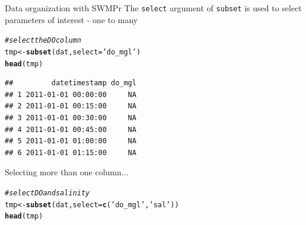 \documentclass[xcolor=dvipsnames,serif]{beamer}\usepackage[]{graphicx}\usepackage[]{color}
\makeatletter
\newcommand{\hlstr}[1]{\textcolor[rgb]{0.192,0.494,0.8}{#1}}%
\newcommand{\hlcom}[1]{\textcolor[rgb]{0.678,0.584,0.686}{\textit{#1}}}%
\newcommand{\hlstd}[1]{\textcolor[rgb]{0.345,0.345,0.345}{#1}}%
\newcommand{\hlkwb}[1]{\textcolor[rgb]{0.69,0.353,0.396}{#1}}%
\newcommand{\hlkwc}[1]{\textcolor[rgb]{0.333,0.667,0.333}{#1}}%
\newcommand{\hlkwd}[1]{\textcolor[rgb]{0.737,0.353,0.396}{\textbf{#1}}}%
\newenvironment{kframe}{%
 \def\at@end@of@kframe{}%
 \ifinner\ifhmode%
  \def\at@end@of@kframe{\end{minipage}}%
  \begin{minipage}{\columnwidth}%
 \fi\fi%
 \def\FrameCommand##1{\hskip\@totalleftmargin \hskip-\fboxsep
 \colorbox{shadecolor}{##1}\hskip-\fboxsep
     \hskip-\linewidth \hskip-\@totalleftmargin \hskip\columnwidth}%
 \MakeFramed {\advance\hsize-\width
   \@totalleftmargin\z@ \linewidth\hsize
   \@setminipage}}%
 {\par\unskip\endMakeFramed%
 \at@end@of@kframe}
\newenvironment{knitrout}{}{} %
\makeatother
\begin{document}
\begin{frame}[fragile]{Data organization with SWMPr}
\onslide<+->
The \texttt{select} argument of \texttt{subset} is used to select parameters of interest - one to many
\begin{knitrout}\scriptsize
{}\color{fgcolor}\begin{kframe}
\begin{alltt}
\hlcom{# select the DO column}
\hlstd{tmp} \hlkwb{<-} \hlkwd{subset}\hlstd{(dat,} \hlkwc{select} \hlstd{=} \hlstr{'do_mgl'}\hlstd{)}
\hlkwd{head}\hlstd{(tmp)}
\end{alltt}
\begin{verbatim}
##         datetimestamp do_mgl
## 1 2011-01-01 00:00:00     NA
## 2 2011-01-01 00:15:00     NA
## 3 2011-01-01 00:30:00     NA
## 4 2011-01-01 00:45:00     NA
## 5 2011-01-01 01:00:00     NA
## 6 2011-01-01 01:15:00     NA
\end{verbatim}
\end{kframe}
\end{knitrout}
Selecting more than one column...
\onslide<+->
\begin{knitrout}\scriptsize
{}\color{fgcolor}\begin{kframe}
\begin{alltt}
\hlcom{# select DO and salinity}
\hlstd{tmp} \hlkwb{<-} \hlkwd{subset}\hlstd{(dat,} \hlkwc{select} \hlstd{=} \hlkwd{c}\hlstd{(}\hlstr{'do_mgl'}\hlstd{,} \hlstr{'sal'}\hlstd{))}
\hlkwd{head}\hlstd{(tmp)}
\end{alltt}
\end{kframe}
\end{knitrout}
\end{frame}
\end{document}
